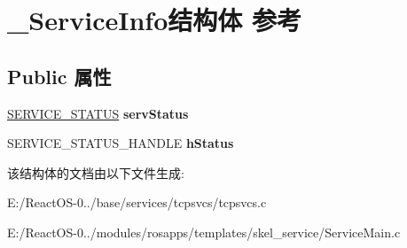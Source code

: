\hypertarget{struct___service_info}{}\section{\+\_\+\+Service\+Info结构体 参考}
\label{struct___service_info}
\subsection*{Public 属性}
\begin{DoxyCompactItemize}
\item 
\mbox{\label{struct___service_info_af2bd2aff5ba722adfa018394c3d2f264}} 
\hyperlink{struct___s_e_r_v_i_c_e___s_t_a_t_u_s}{S\+E\+R\+V\+I\+C\+E\+\_\+\+S\+T\+A\+T\+US} {\bfseries serv\+Status}
\item 
\mbox{\label{struct___service_info_a7309f053ec26f0ecc9a17f66ab49fa35}} 
S\+E\+R\+V\+I\+C\+E\+\_\+\+S\+T\+A\+T\+U\+S\+\_\+\+H\+A\+N\+D\+LE {\bfseries h\+Status}
\end{DoxyCompactItemize}


该结构体的文档由以下文件生成\+:\begin{DoxyCompactItemize}
\item 
E\+:/\+React\+O\+S-\/0../base/services/tcpsvcs/tcpsvcs.\+c\item 
E\+:/\+React\+O\+S-\/0../modules/rosapps/templates/skel\+\_\+service/Service\+Main.\+c\end{DoxyCompactItemize}
